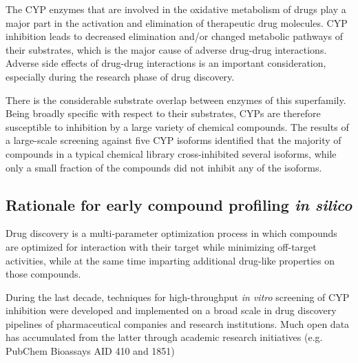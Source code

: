 The CYP enzymes that are involved in the oxidative metabolism of drugs play a major part in the activation and elimination of therapeutic drug molecules. CYP inhibition leads to decreased elimination and/or changed metabolic pathways of their substrates, which is the major cause of adverse drug-drug interactions.\cite{Lapins2013} Adverse side effects of drug-drug interactions is an important consideration, especially during the research phase of drug discovery.\cite{Cheng2011}


There is the considerable substrate overlap between enzymes of this superfamily. Being broadly specific with respect to their substrates, CYPs are therefore susceptible to inhibition by a large variety of chemical compounds. The results of a large-scale screening against five CYP isoforms identified that the majority of compounds in a typical chemical library cross-inhibited several isoforms, while only a small fraction of the compounds did not inhibit any of the isoforms.\cite{Veith2009}


\subsection{Rationale for early compound profiling \textit{in silico}}

Drug discovery is a multi-parameter optimization process in which compounds are optimized for interaction with their target while minimizing off-target activities, while at the same time imparting additional drug-like properties on those compounds.\cite{Zlokarnik2005}



During the last decade, techniques for high-throughput \textit{in vitro} screening of CYP inhibition were developed and implemented on a broad scale in drug discovery pipelines of pharmaceutical companies and research institutions. Much open data has accumulated from the latter through academic research initiatives (e.g. PubChem Bioassays AID 410 and 1851)


